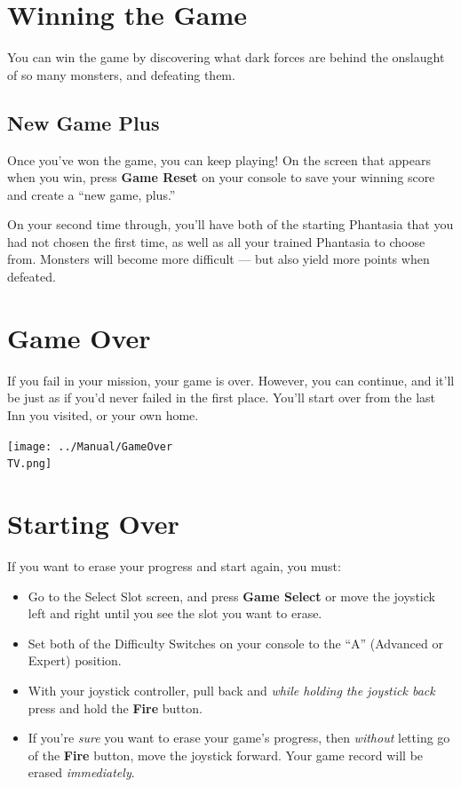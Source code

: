 \documentclass[10pt,twocolumn,openany,article]{memoir}
\newcommand\TV{NTSC}
\newcommand\TV{PAL}
\begin{document}
\section{Winning the Game}

You can  win the  game by  discovering what dark  forces are  behind the
onslaught of so many monsters, and defeating them.

\subsection*{New Game Plus}\label{sec:NewGamePlus}

Once  you've won  the game,  you can  keep playing!  On the  screen that
appears when you win, press \textbf{Game  Reset} on your console to save
your winning score and create a ``new game, plus.''

On your second time through, you'll  have both of the starting Phantasia
that you  had not  chosen the first  time, as well  as all  your trained
Phantasia to choose from. Monsters will become more difficult — but also
yield more points when defeated.

\section{Game Over}

If  you fail  in  your mission,  your  game is  over.  However, you  can
continue, and it'll be just as if you'd never failed in the first place.
You'll start over from the last Inn you visited, or your own home.

\begin{center}
  \texttt{[image: ../Manual/GameOver\\TV.png]}
\end{center}

\section{Starting Over}\label{Starting Your Adventure Over}

If you want to erase your progress and start again, you must:

\begin{itemize}
\item Go  to the Select Slot  screen, and press \textbf{Game  Select} or
  move  the joystick  left and  right until  you see  the slot  you want
  to erase.
\item Set both  of the Difficulty Switches on your  console to the ``A''
  (Advanced or Expert) position.
\item With your  joystick controller, pull back  and \emph{while holding
    the joystick back} press and hold the \textbf{Fire} button.
\item If you're \emph{sure} you want to erase your game's progress, then
  \emph{without}  letting  go  of  the \textbf{Fire}  button,  move  the
  joystick  forward. \ifdefined\DEMO  Your  game record  will be  erased
  \emph{immediately}. \fi
\end{itemize}
\end{document}
